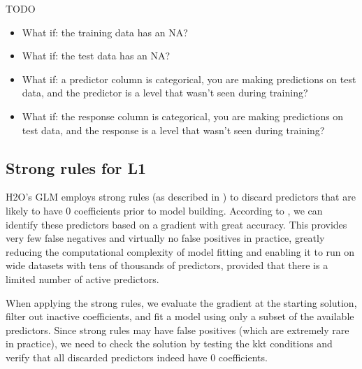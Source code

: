 TODO

\begin{itemize}
\item What if: the training data has an NA?

\item What if: the test data has an NA?

\item What if: a predictor column is categorical, you are making predictions on test data, and the predictor is
a level that wasn't seen during training?

\item What if: the response column is categorical, you are making predictions on test data, and the response is
a level that wasn't seen during training?
\end{itemize}

\subsection{Strong rules for L1} \label{strongrules}

H2O's GLM employs strong rules (as described in ) to discard predictors that are likely to have
0 coefficients prior to model building. According to , we can identify these predictors based on
a gradient with great accuracy. This provides very few false negatives and virtually no false positives in
practice, greatly reducing the computational complexity of model fitting and enabling it to run on wide datasets
with tens of thousands of predictors, provided that there is a limited number of active predictors.

When applying the strong rules, we evaluate the gradient at the starting solution, filter out inactive
coefficients, and fit a model using only a subset of the available predictors. Since strong rules may have false
positives (which are extremely rare in practice), we need to check the solution by testing the kkt conditions and
verify that all discarded predictors indeed have 0 coefficients.






